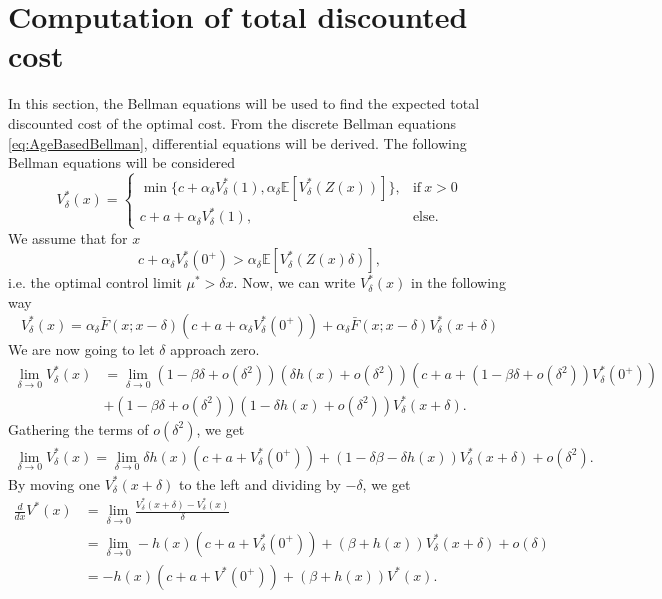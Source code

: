 \section{Computation of total discounted cost}
In this section, the Bellman equations will be used to find the expected total discounted cost of the optimal cost.
From the discrete Bellman equations \eqref{eq:AgeBasedBellman}, differential equations will be derived.
The following Bellman equations will be considered
\[V_\delta^*(x)=\begin{cases}
\min\{c+\alpha_\delta V^*_\delta(1),\alpha_\delta \mathbb{E}[V^*_\delta(Z(x))]\},&\text{if}\ x>0 \\
c+a+\alpha_\delta V^*_\delta(1),&\text{else.}
\end{cases}\]
We assume that for $x$
$$
c+\alpha_\delta V^*_\delta(0^+)>\alpha_\delta \mathbb{E}[V^*_\delta(Z(x)\delta)],
$$
i.e. the optimal control limit $\mu^*>\delta x$.
Now, we can write $V^*_\delta(x)$ in the following way
\[V^*_\delta(x)=\alpha_\delta \bar F(x;x-\delta) (c+a+\alpha_\delta V^*_\delta(0^+))
+\alpha_\delta \bar F(x;x-\delta)V^*_\delta(x+\delta)
\]
We are now going to let $\delta$ approach zero.
\begin{equation}
\begin{split}
\lim\limits_{\delta\rightarrow 0} V_\delta^*(x) &=
\lim\limits_{\delta\rightarrow 0}(1-\beta\delta+o(\delta^2)) (\delta h(x)+o(\delta^2))(c+a+(1-\beta\delta+o(\delta^2)) V^*_\delta(0^+))\\
&+(1-\beta\delta+o(\delta^2)) (1-\delta h(x)+o(\delta^2))V_\delta^*(x+\delta).
\end{split}
\end{equation}
Gathering the terms of $o(\delta^2)$, we get
\begin{equation}\label{eq:gatheredDelta}
\begin{split}
\lim\limits_{\delta\rightarrow 0} V_\delta^*(x) =
\lim\limits_{\delta\rightarrow 0}\delta h(x)(c+a+ V_\delta^*(0^+))+(1-\delta\beta-\delta h(x)) V_\delta^*(x+\delta)+o(\delta^2).
\end{split}
\end{equation}
By moving one $V_\delta^*(x+\delta)$ to the left and dividing by $-\delta$, we get
\begin{equation}\label{eq:AgeBasedBellmanODE}
\begin{split}
\frac{d}{dx}V^*(x)&=\lim\limits_{\delta\rightarrow 0} \frac{V_\delta^*(x+\delta)-V_\delta^*(x)}{\delta} \\
&=\lim\limits_{\delta\rightarrow 0} -h(x)(c+a+ V_\delta^*(0^+))+(\beta+ h(x)) V_\delta^*(x+\delta)+o(\delta)\\
&=-h(x)(c+a+ V^*(0^+))+(\beta+ h(x)) V^*(x).
\end{split}
\end{equation}
